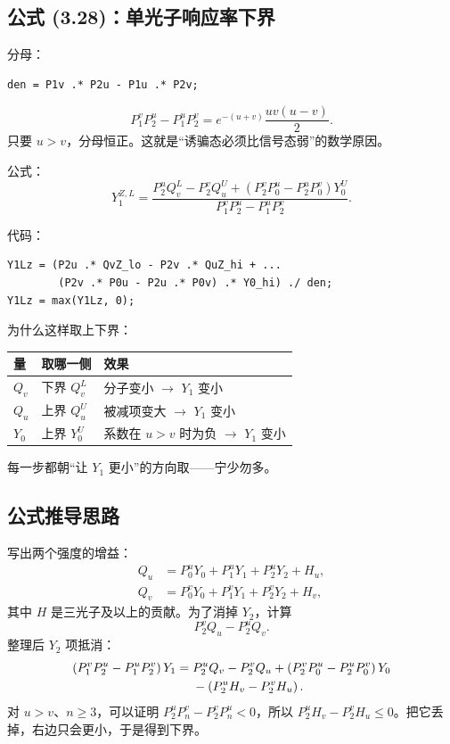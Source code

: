 \documentclass[UTF8,11pt,a4paper]{ctexart}
\newcommand{\Yone}{Y_1}
\newcommand{\YoneZ}{Y_1^{Z,L}}
\begin{document}
\subsection{公式 (3.28)：单光子响应率下界}

分母：
\begin{lstlisting}
den = P1v .* P2u - P1u .* P2v;
\end{lstlisting}
\begin{equation}
P_1^vP_2^u-P_1^uP_2^v
=e^{-(u+v)}\frac{uv(u-v)}{2}.
\end{equation}
只要 $u>v$，分母恒正。这就是“诱骗态必须比信号态弱”的数学原因。

公式：
\begin{equation}
\YoneZ=
\frac{
P_2^uQ_v^L-P_2^vQ_u^U+
\left(P_2^vP_0^u-P_2^uP_0^v\right)Y_0^U
}{
P_1^vP_2^u-P_1^uP_2^v
}.
\label{eq:y1}
\end{equation}

代码：

\begin{lstlisting}
Y1Lz = (P2u .* QvZ_lo - P2v .* QuZ_hi + ...
        (P2v .* P0u - P2u .* P0v) .* Y0_hi) ./ den;
Y1Lz = max(Y1Lz, 0);
\end{lstlisting}

为什么这样取上下界：

\begin{center}
\begin{tabular}{@{}lll@{}}
\toprule
量 & 取哪一侧 & 效果\\
\midrule
$Q_v$ & 下界 $Q_v^L$ & 分子变小 $\to$ $\Yone$ 变小\\
$Q_u$ & 上界 $Q_u^U$ & 被减项变大 $\to$ $\Yone$ 变小\\
$Y_0$ & 上界 $Y_0^U$ & 系数在 $u>v$ 时为负 $\to$ $\Yone$ 变小\\
\bottomrule
\end{tabular}
\end{center}

每一步都朝“让 $\Yone$ 更小”的方向取——宁少勿多。

\subsection{公式推导思路}

写出两个强度的增益：
\begin{align}
Q_u&=P_0^uY_0+P_1^uY_1+P_2^uY_2+H_u,\\
Q_v&=P_0^vY_0+P_1^vY_1+P_2^vY_2+H_v,
\end{align}
其中 $H$ 是三光子及以上的贡献。为了消掉 $Y_2$，计算
\[
P_2^vQ_u-P_2^uQ_v.
\]
整理后 $Y_2$ 项抵消：
\begin{align}
\left(P_1^vP_2^u-P_1^uP_2^v\right)Y_1
={}&P_2^uQ_v-P_2^vQ_u
+\left(P_2^vP_0^u-P_2^uP_0^v\right)Y_0 \notag\\
&-\left(P_2^uH_v-P_2^vH_u\right).
\end{align}
对 $u>v$、$n\ge3$，可以证明
$P_2^uP_n^v-P_2^vP_n^u<0$，所以
$P_2^uH_v-P_2^vH_u\le0$。把它丢掉，右边只会更小，于是得到下界。
\end{document}
